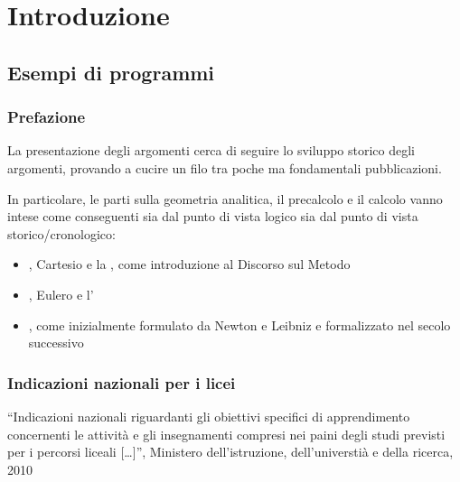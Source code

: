 \documentclass[letterpaper,10pt,english]{jupyterBook}
\begin{document}
\sphinxstepscope


\part{Introduzione}

\sphinxstepscope


\chapter{Esempi di programmi}
\label{\detokenize{ch/school-programs:esempi-di-programmi}}\label{\detokenize{ch/school-programs::doc}}
\sphinxAtStartPar
{}

\sphinxstepscope


\section{Prefazione}
\label{\detokenize{ch/school-programs/intro:prefazione}}\label{\detokenize{ch/school-programs/intro::doc}}
\sphinxAtStartPar
La presentazione degli argomenti cerca di seguire lo sviluppo storico degli argomenti, provando a cucire un filo tra poche ma fondamentali pubblicazioni.

\sphinxAtStartPar
In particolare, le parti sulla geometria analitica, il precalcolo e il calcolo vanno intese come conseguenti sia dal punto di vista logico sia dal punto di vista storico/cronologico:
\begin{itemize}
\item {} 
\sphinxAtStartPar
{}, Cartesio e la , come introduzione al Discorso sul Metodo

\item {} 
\sphinxAtStartPar
{}, Eulero e l’

\item {} 
\sphinxAtStartPar
{}, come inizialmente formulato da Newton e Leibniz e formalizzato nel secolo successivo

\end{itemize}

\sphinxstepscope


\section{Indicazioni nazionali per i licei}
\label{\detokenize{ch/school-programs/current-guidelines-italy:indicazioni-nazionali-per-i-licei}}\label{\detokenize{ch/school-programs/current-guidelines-italy::doc}}
\sphinxAtStartPar
“Indicazioni nazionali riguardanti gli obiettivi specifici di apprendimento concernenti le attività e gli insegnamenti compresi nei paini degli studi previsti per i percorsi liceali {[}…{]}”, Ministero dell’istruzione, dell’universtià e della ricerca, 2010
\end{document}
